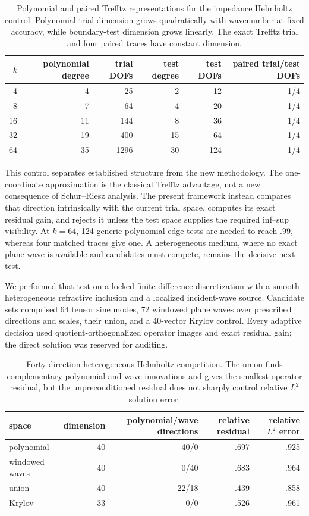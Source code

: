 \documentclass[11pt]{article}
\numberwithin{algorithm}{section}
\theoremstyle{definition}\newtheorem{definition}[theorem]{Definition}
\theoremstyle{remark}\newtheorem{remark}[theorem]{Remark}
\begin{document}
\begin{table}[t]
\centering
\caption{Polynomial and paired Trefftz representations for the impedance
Helmholtz control. Polynomial trial dimension grows quadratically with
wavenumber at fixed accuracy, while boundary-test dimension grows linearly.
The exact Trefftz trial and four paired traces have constant dimension.}
\begin{tabular}{rrrrrr}
\toprule
$k$ & polynomial degree & trial DOFs & test degree & test DOFs & paired trial/test DOFs\\
\midrule
4  & 4  & 25   & 2  & 12  & 1/4\\
8  & 7  & 64   & 4  & 20  & 1/4\\
16 & 11 & 144  & 8  & 36  & 1/4\\
32 & 19 & 400  & 15 & 64  & 1/4\\
64 & 35 & 1296 & 30 & 124 & 1/4\\
\bottomrule
\end{tabular}
\label{tab:helmholtz-paired}
\end{table}

This control separates established structure from the new methodology. The
one-coordinate approximation is the classical Trefftz advantage, not a new
consequence of Schur--Riesz analysis. The present framework instead compares
that direction intrinsically with the current trial space, computes its exact
residual gain, and rejects it unless the test space supplies the required
inf--sup visibility. At $k=64$, 124 generic polynomial edge tests are needed
to reach $.99$, whereas four matched traces give one. A heterogeneous medium,
where no exact plane wave is available and candidates must compete, remains
the decisive next test.

We performed that test on a locked finite-difference discretization with a
smooth heterogeneous refractive inclusion and a localized incident-wave
source. Candidate sets comprised 64 tensor sine modes, 72 windowed plane waves
over prescribed directions and scales, their union, and a 40-vector Krylov
control. Every adaptive decision used quotient-orthogonalized operator images
and exact residual gain; the direct solution was reserved for auditing.

\begin{table}[t]
\centering
\caption{Forty-direction heterogeneous Helmholtz competition. The union finds
complementary polynomial and wave innovations and gives the smallest operator
residual, but the unpreconditioned residual does not sharply control relative
$L^2$ solution error.}
\begin{tabular}{lrrrr}
\toprule
space & dimension & polynomial/wave directions & relative residual & relative $L^2$ error\\
\midrule
polynomial & 40 & 40/0  & .697 & .925\\
windowed waves & 40 & 0/40  & .683 & .964\\
union & 40 & 22/18 & .439 & .858\\
Krylov & 33 & 0/0 & .526 & .961\\
\bottomrule
\end{tabular}
\label{tab:heterogeneous-helmholtz}
\end{table}
\end{document}

